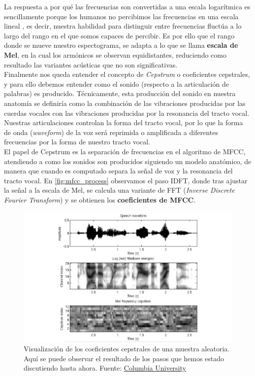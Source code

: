 \documentclass[11pt,a4paper,spanish]{book}
\begin{document}
	La respuesta a por qué las frecuencias son convertidas a una escala logarítmica es sencillamente porque los humanos no percibimos las frecuencias en una escala lineal \cite{Varshney}, es decir, nuestra habilidad para distinguir entre frecuencias fluctúa a lo largo del rango en el que somos capaces de percibir\cite{StevensVolkmann}. Es por ello que el rango donde se mueve nuestro espectograma, se adapta a lo que se llama \textbf{escala de Mel}, en la cual los armónicos se observan equidistantes, reduciendo como resultado las variantes acústicas que no son significativas.\\
	
	Finalmente nos queda entender el concepto de \emph{Cepstrum} o coeficientes cepstrales, y para ello debemos entender como el sonido (respecto a la articulación de palabras) es producido. Técnicamente, esta producción del sonido en nuestra anatomía se definiría como la combinación de las vibraciones producidas por las cuerdas vocales con las vibraciones producidas por la resonancia del tracto vocal. Nuestras articulaciones controlan la forma del tracto vocal, por lo que la forma de onda (\emph{waveform}) de la voz será reprimida o amplificada a diferentes frecuencias por la forma de nuestro tracto vocal.\\
	El papel de Cepstrum es la separación de frecuencias en el algoritmo de MFCC, atendiendo a como los sonidos son producidos siguiendo un modelo anatómico, de manera que cuando es computado separa la señal de voz y la resonancia del tracto vocal. En \ref{fig:mfcc_process} observamos el paso IDFT, donde tras ajustar la señal a la escala de Mel, se calcula una variante de FFT (\emph{Inverse Discrete Fourier Transform}) y se obtienen los \textbf{coeficientes de MFCC}.
	
	\begin{figure}[h]
		\centering
		\includegraphics[scale=0.3]{waveform_process.jpeg} 
		\caption{Visualización de los coeficientes cepstrales de una muestra aleatoria. Aquí se puede observar el resultado de los pasos que hemos estado discutiendo hasta ahora. Fuente: \href{https://www.ee.columbia.edu/~stanchen/spring16/e6870/slides/lecture3.pdf}{Columbia University}}
	\end{figure}
	
\end{document}
